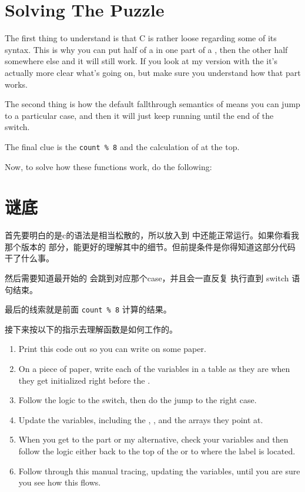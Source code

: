 \section{Solving The Puzzle}
The first thing to understand is that C is rather loose regarding some
of its syntax.  This is why you can put half of a  in
one part of a , then the other half somewhere
else and it will still work.  If you look at my version with the 
it's actually more clear what's going on, but make sure you understand
how that part works.


The second thing is how the default fallthrough semantics of
 means you can jump to a particular case, and
then it will just keep running until the end of the switch.


The final clue is the \verb|count % 8| and the calculation of  at
the top.

Now, to solve how these functions work, do the following:

\section{谜底}
首先要明白的是c的语法是相当松散的，所以放入到
中还能正常运行。如果你看我那个版本的
部分，能更好的理解其中的细节。但前提条件是你得知道这部分代码干了什么事。

然后需要知道最开始的  会跳到对应那个case，并且会一直反复
执行直到 switch 语句结束。

最后的线索就是前面 \verb|count % 8| 计算的结果。

接下来按以下的指示去理解函数是如何工作的。

\begin{enumerate}
\item Print this code out so you can write on some paper.

\item On a piece of paper, write each of the variables in a table as they
    are when they get initialized right before the .

\item Follow the logic to the switch, then do the jump to the right case.

\item Update the variables, including the , , and the
    arrays they point at.

\item When you get to the  part or my  alternative,
    check your variables and then follow the logic either back to the
    top of the  or to where the  label is 
    located.

\item Follow through this manual tracing, updating the variables, until
    you are sure you see how this flows.
\end{enumerate}


